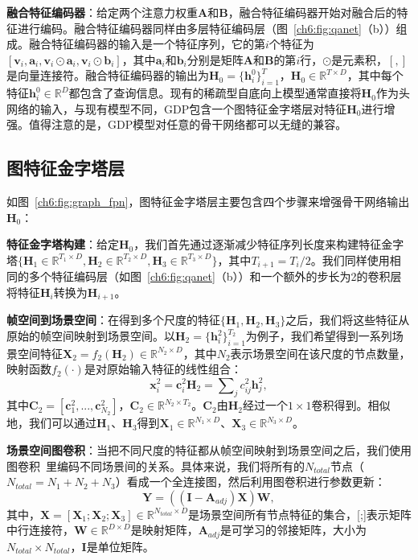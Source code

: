 \textbf{融合特征编码器}：给定两个注意力权重$\bm{A}$和$\bm{B}$，融合特征编码器开始对融合后的特征进行编码。融合特征编码器同样由多层特征编码层（图~\ref{ch6:fig:qanet}（b））组成。融合特征编码器的输入是一个特征序列，它的第$i$个特征为$[\bm{v}_i, \bm{a}_i, \bm{v}_i\odot \bm{a}_i, \bm{v}_i\odot \bm{b}_i]$，其中$\bm{a}_i$和$\bm{b}_i$分别是矩阵$\bm{A}$和$\bm{B}$的第$i$行，$\odot$是元素积，$[,]$是向量连接符。融合特征编码器的输出为$\bm{H}_0=\{\bm{h}^0_i\}^T_{i=1}$，$\bm{H}_0 \in \mathbb{R}^{T\times D}$，其中每个特征$\bm{h}^0_i \in \mathbb{R}^D$都包含了查询信息。现有的稀疏型自底向上模型通常直接将$\bm{H}_0$作为头网络的输入，与现有模型不同，GDP包含一个图特征金字塔层对特征$\bm{H}_0$进行增强。值得注意的是，GDP模型对任意的骨干网络都可以无缝的兼容。


\subsection{图特征金字塔层}
如图~\ref{ch6:fig:graph_fpn}，图特征金字塔层主要包含四个步骤来增强骨干网络输出$\bm{H}_0$：

\textbf{特征金字塔构建}：给定$\bm{H}_0$，我们首先通过逐渐减少特征序列长度来构建特征金字塔$\{\bm{H}_1 \in \mathbb{R}^{T_1\times D}, \bm{H}_2 \in \mathbb{R}^{T_2\times D}, \bm{H}_3 \in \mathbb{R}^{T_3\times D}\}$，其中$T_{i+1} = T_i/2$。我们同样使用相同的多个特征编码层（如图~\ref{ch6:fig:qanet}（b））和一个额外的步长为2的卷积层将特征$\bm{H}_i$转换为$\bm{H}_{i+1}$。

\textbf{帧空间到场景空间}：在得到多个尺度的特征$\{\bm{H}_1, \bm{H}_2, \bm{H}_3\}$之后，我们将这些特征从原始的帧空间映射到场景空间。以$\bm{H}_2 = \{\bm{h}^2_i\}^{T_2}_{i=1}$为例子，我们希望得到一系列场景空间特征$\bm{X}_2 = f_2(\bm{H}_2) \in \mathbb{R}^{N_2\times D}$，其中$N_2$表示场景空间在该尺度的节点数量，映射函数$f_2(\cdot)$是对原始输入特征的线性组合：
\begin{equation} \label{ch6:eq:eq_2}
    \bm{x}^2_i = \bm{c}^2_i \bm{H}_2 = \sum\nolimits_j c^2_{ij}\bm{h}^2_j,
\end{equation}
其中$\bm{C}_2 = [\bm{c}^2_1, ..., \bm{c}^2_{N_2}]$，$\bm{C}_2 \in \mathbb{R}^{N_2\times T_2}$。$\bm{C}_2$由$\bm{H}_2$经过一个$1\times1$卷积得到。相似地，我们可以通过$\bm{H}_1$、$\bm{H}_3$得到$\bm{X}_1 \in \mathbb{R}^{N_1\times D}$、$\bm{X}_3 \in \mathbb{R}^{N_3\times D}$。


\textbf{场景空间图卷积}：当把不同尺度的特征都从帧空间映射到场景空间之后，我们使用图卷积~\cite{kipf2017semi}里编码不同场景间的关系。具体来说，我们将所有的$N_{total}$节点（$N_{total} = N_1 + N_2 + N_3$）看成一个全连接图，然后利用图卷积进行参数更新：
\begin{equation}
    \bm{Y} = ((\bm{I}-\bm{A}_{adj})\bm{X})\bm{W},
\end{equation}
其中，$\bm{X} = [\bm{X}_1; \bm{X}_2; \bm{X}_3] \in \mathbb{R}^{N_{total}\times D}$是场景空间所有节点特征的集合，[;]表示矩阵中行连接符，$\bm{W}\in \mathbb{R}^{D\times D}$是映射矩阵，$\bm{A}_{adj}$是可学习的邻接矩阵，大小为$N_{total}\times N_{total}$，$\bm{I}$是单位矩阵。


